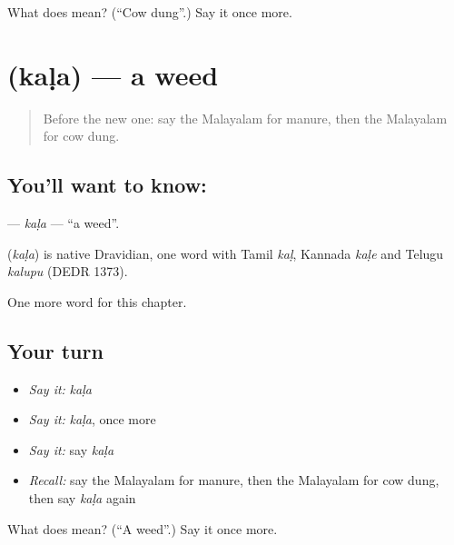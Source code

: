 \begin{tcolorbox}[breakable,colback=teal!4,colframe=teal!35!black,title={Before you move on}]
What does  mean? (\textquotedblleft{}Cow dung\textquotedblright{}.) Say it once more.
\end{tcolorbox}
\section[\texorpdfstring{\ml{കള} (kaḷa)}{കള (kaḷa)}]{ (kaḷa) — a weed}

\label{lesson:ML-C218-kala2}



\begin{quote}
Before the new one: say the Malayalam for manure, then the Malayalam for cow dung.
\end{quote}

\subsection*{You'll want to know: }
\textbf{} — \emph{kaḷa} — \textquotedblleft{}a weed\textquotedblright{}.

\begin{cousinweb}
\textbf{} (\emph{kaḷa}) is native Dravidian, one word with Tamil \emph{kaḷ}, Kannada \emph{kaḷe} and Telugu \emph{kalupu} (DEDR 1373).
\end{cousinweb}

\begin{grammarlens}[title={What you've built}]
One more word for this chapter.
\end{grammarlens}

\subsection*{Your turn}
\begin{itemize}
\raggedright
  \item \emph{Say it:} \emph{kaḷa}
  \item \emph{Say it:} \emph{kaḷa}, once more
  \item \emph{Say it:} say \emph{kaḷa}
  \item \emph{Recall:} say the Malayalam for manure, then the Malayalam for cow dung, then say \emph{kaḷa} again
\end{itemize}

\begin{tcolorbox}[breakable,colback=teal!4,colframe=teal!35!black,title={Before you move on}]
What does  mean? (\textquotedblleft{}A weed\textquotedblright{}.) Say it once more.
\end{tcolorbox}
